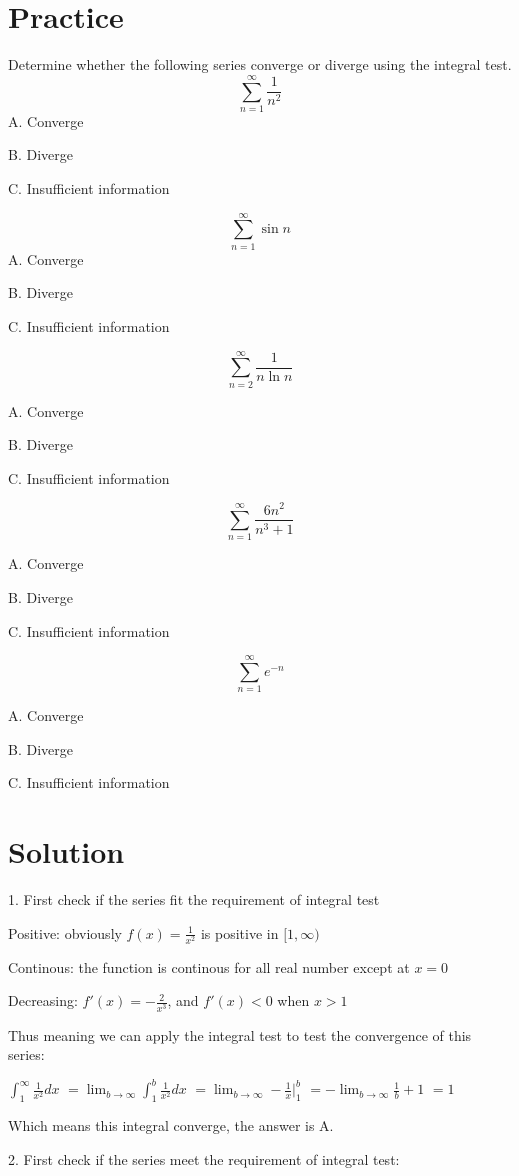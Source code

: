 \documentclass{article}
\numberwithin{equation}{section}
\begin{document}
\section{Practice}
Determine whether the following series converge or diverge using the integral test.
\[
\sum_{n=1}^{\infty} \frac{1}{n^2}
\]
A. Converge 

B. Diverge 

C. Insufficient information

\[
\sum_{n=1}^{\infty} \sin n 
\]
A. Converge 

B. Diverge 

C. Insufficient information

\[
\sum_{n=2}^{\infty} \frac{1}{n \ln n}
\]

A. Converge 

B. Diverge 

C. Insufficient information

\[
\sum_{n=1}^{\infty} \frac{6n^2}{n^3+1}
\]

A. Converge 

B. Diverge 

C. Insufficient information

\[
\sum_{n=1}^{\infty} e^{-n}
\]

A. Converge 

B. Diverge 

C. Insufficient information
\section{Solution}
1. First check if the series fit the requirement of integral test

Positive: obviously $\displaystyle f(x) = \frac{1}{x^2}$ is positive in $[1 , \infty)$

Continous: the function is continous for all real number except at $x=0$

Decreasing: $\displaystyle f'(x) = -\frac{2}{x^3}$, and $f'(x) < 0$ when $x > 1$

Thus meaning we can apply the integral test to test the convergence of this series:

$\displaystyle \int_{1}^{\infty} \frac{1}{x^2}dx$
$\displaystyle = \lim_{b\to \infty}\int_{1}^{b} \frac{1}{x^2}dx$
$\displaystyle = \lim_{b\to \infty}-\frac{1}{x}\Big|_1^b$
$\displaystyle = -\lim_{b\to \infty} \frac{1}{b} + 1$
$\displaystyle = 1$

Which means this integral converge, the answer is A.

2. First check if the series meet the requirement of integral test:
\end{document}
